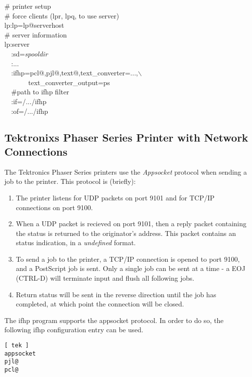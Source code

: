 \documentclass[a4paper]{article}
\begin{document}
\begin{tscreen}
\# printer setup  \\ 
\#  force clients (lpr, lpq, to use server)  \\ 
lp:lp=lp@serverhost  \\ 
\# server information  \\ 
lp:server  \\ 
~~:sd={\itshape spooldir\/}  \\ 
~~:...  \\ 
~~:ifhp=pcl@,pjl@,text@,text\_converter=...,$\backslash$ \\ 
~~~~~~~text\_converter\_output=ps~\\ 
~~\#path to ifhp filter  \\ 
~~:if=/.../ifhp  \\ 
~~:of=/.../ifhp  
\end{tscreen}





\subsection{Tektronixs Phaser Series Printer with Network Connections}

The Tektronics Phaser Series printers use the
{\itshape Appsocket\/} protocol when sending a job to the printer.
This protocol is (briefly):
\begin{enumerate}
\item  The printer listens for UDP packets on port 9101
and for TCP/IP connections on port 9100.
\item  When a UDP packet is recieved on port 9101, then a reply
packet containing the status is returned to the originator's
address.
This packet contains an status indication,
in a {\itshape undefined\/} format.
\item  To send a job to the printer,  a TCP/IP connection is opened to port
9100,
and a PostScript job is sent.
Only a single job can be sent at a time - a EOJ (CTRL-D)
will terminate input and flush all following jobs.
\item Return status will be sent in the reverse direction until the job
has completed,
at which point the connection will be closed.
\end{enumerate}


The {\ttfamily ifhp} program supports the {\ttfamily appsocket} protocol.
In order to do so,
the following ifhp configuration entry can be used.
\begin{tscreen}
\begin{verbatim}
[ tek ]
appsocket
pjl@
pcl@
\end{verbatim}
\end{tscreen}
\end{document}
